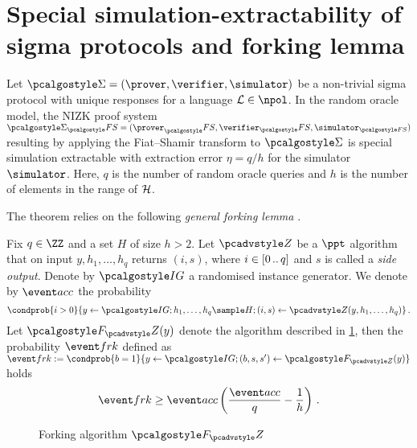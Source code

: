 \documentclass[runningheads,10pt]{llncs}
\begin{document}
\section{Special simulation-extractability of sigma protocols and forking lemma}
\label{sec:forking_lemma}
\begin{theorem}
	Let $\sigmaprot = (\prover, \verifier, \simulator)$ be a non-trivial sigma
  protocol with unique responses for a language $\LANG \in \npol$. In the random
  oracle model, the NIZK proof system $\sigmaprot_\fs = (\prover_\fs,
  \verifier_\fs, \simulator_{\fs})$ resulting by applying the Fiat--Shamir
  transform to $\sigmaprot$ is special simulation extractable with extraction error
  $\eta = q/h$ for the simulator $\simulator$. Here, $q$ is the number of random
  oracle queries and $h$ is the number of elements in the range of $\mathcal{H}$.
\end{theorem}

The theorem relies on the following \emph{general forking lemma} \cite{JC:PoiSte00}.

\begin{lemma}
	\label{lem:forking_lemma}
	Fix $q \in \ZZ$ and a set $H$ of size $h > 2$. Let $\zdv$ be a $\ppt$
  algorithm that on input $y, h_1, \ldots, h_q$ returns $(i, s)$, where $i
  \in[0 \, .. \, q]$ and $s$ is called a \emph{side output}. Denote by $\ig$ a
  randomised instance generator. We denote by $\accProb$ the probability
	\[
		\condprob{i > 0}{y \gets \ig; h_1, \ldots, h_q \sample H; (i, s) \gets
		\zdv(y, h_1, \ldots, h_q)}\,.
	\]
	Let $\forking_\zdv(y)$ denote the algorithm described in
  \cref{fig:forking_lemma}, then the probability $\frkProb$ defined as $
  \frkProb := \condprob{b = 1}{y \gets \ig; (b, s, s') \gets \forking_{\zdv}(y)}
  $ holds
	\[
		\frkProb \geq \accProb \brak{\frac{\accProb}{q} - \frac{1}{h}}\,.
	\]
	\begin{figure}
		\centering
		\caption{Forking algorithm $\forking_\zdv$}
		\label{fig:forking_lemma}
\end{figure}
\end{lemma}
\end{document}
